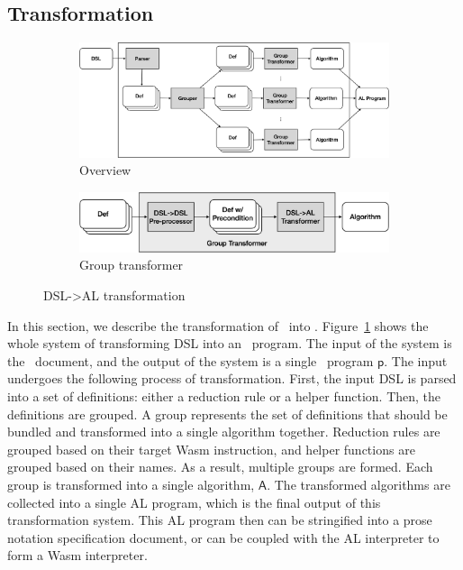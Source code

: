 \subsection{Transformation}

\begin{figure}
  \centering
  \begin{subfigure}[b]{0.9\textwidth}
    \includegraphics[width=\textwidth]{img/trans1}
    \caption{Overview}
    \label{fig:overview}
  \end{subfigure}
  \hfill
  \begin{subfigure}[b]{0.9\textwidth}
    \includegraphics[width=\textwidth]{img/trans2}
    \caption{Group transformer}
    \label{fig:grouptrans}
  \end{subfigure}
  \caption{DSL->AL transformation}
  \label{fig:trans}
\end{figure}

In this section, we describe the transformation of \dsl~into \al.
Figure~\ref{fig:overview} shows the whole system of transforming DSL into an \al~program.
The input of the system is the \dsl~document,
and the output of the system is a single \al~program $\mathsf{p}$.
The input undergoes the following process of transformation.
First, the input DSL is parsed into a set of definitions: either a reduction rule or a
helper function. Then, the definitions are grouped.
A group represents the set of definitions that should be bundled and transformed
into a single algorithm together.
Reduction rules are grouped based on
their target Wasm instruction, and helper functions are grouped based on their names.
As a result, multiple groups are formed. Each group is transformed into a single algorithm,
$\mathsf{A}$. The transformed algorithms are collected into a single AL program, which is the
final output of this transformation system. This AL program then can be stringified into a
prose notation specification document, or can be coupled with the AL interpreter to form a Wasm interpreter.

